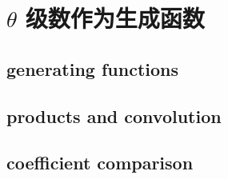 \section{\texorpdfstring{\(\theta\)}{θ} 级数作为生成函数}
\label{b3:sec:2403}


\subsection{generating functions}
\label{b3:subsec:240301}

\subsection{products and convolution}
\label{b3:subsec:240302}

\subsection{coefficient comparison}
\label{b3:subsec:240303}


